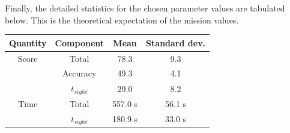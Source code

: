 Finally, the detailed statistics for the chosen parameter values are tabulated below. This is the theoretical expectation of the mission values.

\begin{center}
    \begin{tabular}{c | c | c | c  }
    \hline
    Quantity & Component & Mean & Standard dev. \\
    \hline
    Score & Total & 78.3 & 9.3 \\
    		  & Accuracy & 49.3 & 4.1 \\
     	  & $t_{sight}$ & 29.0 & 8.2 \\ \hline
    Time  & Total & 557.0 s & 56.1 s \\
     	  & $t_{sight}$ & 180.9 s & 33.0 s \\ \hline
    \end{tabular}
\end{center}
